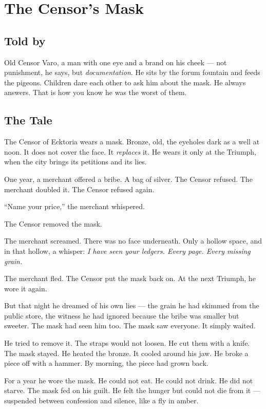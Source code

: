 \chapter{The Censor's Mask}

\section*{Told by}
Old Censor Varo, a man with one eye and a brand on his cheek --- not punishment, he says, but \textit{documentation}. He sits by the forum fountain and feeds the pigeons. Children dare each other to ask him about the mask. He always answers. That is how you know he was the worst of them.

\section*{The Tale}

The Censor of Ecktoria wears a mask. Bronze, old, the eyeholes dark as a well at noon. It does not cover the face. It \textit{replaces} it. He wears it only at the Triumph, when the city brings its petitions and its lies.

One year, a merchant offered a bribe. A bag of silver. The Censor refused. The merchant doubled it. The Censor refused again.

``Name your price,'' the merchant whispered.

The Censor removed the mask.

The merchant screamed. There was no face underneath. Only a hollow space, and in that hollow, a whisper: \textit{I have seen your ledgers. Every page. Every missing grain.}

The merchant fled. The Censor put the mask back on. At the next Triumph, he wore it again.

But that night he dreamed of his own lies --- the grain he had skimmed from the public store, the witness he had ignored because the bribe was smaller but sweeter. The mask had seen him too. The mask saw everyone. It simply waited.

He tried to remove it. The straps would not loosen. He cut them with a knife. The mask stayed. He heated the bronze. It cooled around his jaw. He broke a piece off with a hammer. By morning, the piece had grown back.

For a year he wore the mask. He could not eat. He could not drink. He did not starve. The mask fed on his guilt. He felt the hunger but could not die from it --- suspended between confession and silence, like a fly in amber.

